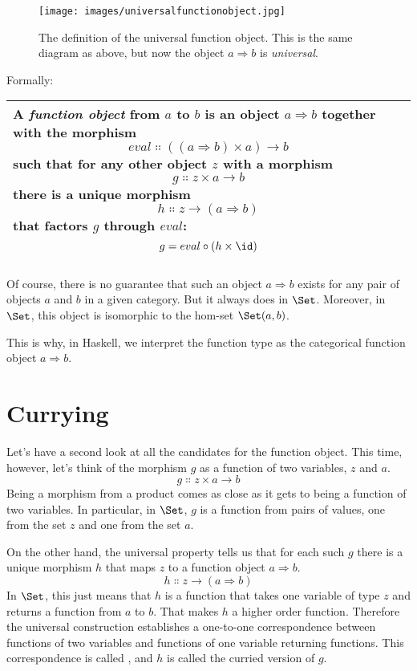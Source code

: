 \begin{figure}[H]
\centering
\texttt{[image: images/universalfunctionobject.jpg]}
\caption{The definition of the universal function object. This is the same
diagram as above, but now the object $a \Rightarrow b$ is \emph{universal}.}
\end{figure}

\noindent
Formally:

\begin{longtable}[]{@{}l@{}}
\toprule
\begin{minipage}[t]{0.97\columnwidth}\raggedright\strut
A \emph{function object} from $a$ to $b$ is an object
$a \Rightarrow b$ together with the morphism
\[eval \Colon ((a \Rightarrow b) \times a) \to b\]
such that for any other object $z$ with a morphism
\[g \Colon z \times a \to b\]
there is a unique morphism
\[h \Colon z \to (a \Rightarrow b)\]
that factors $g$ through $eval$:
\[g = eval \circ (h \times \id)\]
\end{minipage}\tabularnewline
\bottomrule
\end{longtable}

\noindent
Of course, there is no guarantee that such an object $a \Rightarrow b$ exists
for any pair of objects $a$ and $b$ in a given category.
But it always does in $\Set$. Moreover, in $\Set$, this
object is isomorphic to the hom-set $\Set(a, b)$.

This is why, in Haskell, we interpret the function type
 as the categorical function object $a \Rightarrow b$.

\section{Currying}

Let's have a second look at all the candidates for the function object.
This time, however, let's think of the morphism $g$ as a function
of two variables, $z$ and $a$.
\[g \Colon z \times a \to b\]
Being a morphism from a product comes as close as it gets to being a
function of two variables. In particular, in $\Set$, $g$ is
a function from pairs of values, one from the set $z$ and one
from the set $a$.

On the other hand, the universal property tells us that for each such
$g$ there is a unique morphism $h$ that maps $z$ to
a function object $a \Rightarrow b$.
\[h \Colon z \to (a \Rightarrow b)\]
In $\Set$, this just means that $h$ is a function that
takes one variable of type $z$ and returns a function from
$a$ to $b$. That makes $h$ a higher order function.
Therefore the universal construction establishes a one-to-one
correspondence between functions of two variables and functions of one
variable returning functions. This correspondence is called
, and $h$ is called the curried version of $g$.

